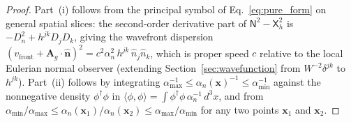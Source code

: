 \documentclass[aps,prd,onecolumn,tightenlines,nofootinbib,notitlepage,11pt,floatfix]{revtex4-2}
\theoremstyle{indentedtheorem}
\begin{document}
\begin{proof}
Part~(i) follows from the principal symbol of Eq.~\eqref{eq:pure_form} on general spatial slices: the second-order derivative part of $\mathsf{N}^2-\mathsf{X}_h^2$ is $-D_n^2 + h^{jk}D_jD_k$, giving the wavefront dispersion $(v_\text{front}+\mathbf{A}_g\cdot\hat{\mathbf{n}})^2 = c^2\alpha_n^2\,h^{jk}\,\hat{n}_j\hat{n}_k$, which is proper speed $c$ relative to the local Eulerian normal observer (extending Section~\ref{sec:wavefunction} from $W^{-2}\delta^{jk}$ to $h^{jk}$). Part~(ii) follows by integrating $\alpha_{\max}^{-1} \le \alpha_n(\mathbf{x})^{-1} \le \alpha_{\min}^{-1}$ against the nonnegative density $\phi^\dagger\phi$ in $\langle\phi,\phi\rangle = \int\phi^\dagger\phi\,\alpha_n^{-1}\,d^3x$, and from $\alpha_{\min}/\alpha_{\max} \le \alpha_n(\mathbf{x}_1)/\alpha_n(\mathbf{x}_2) \le \alpha_{\max}/\alpha_{\min}$ for any two points $\mathbf{x}_1$ and $\mathbf{x}_2$.


\end{proof}
\end{document}
